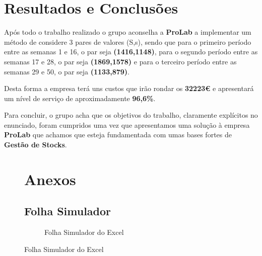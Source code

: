 \documentclass[a4paper]{article}
\begin{document}
\section{Resultados e Conclusões}
\label{sec:conclusao}

Após todo o trabalho realizado o grupo aconselha a \textbf{ProLab} a implementar um método de considere 3 pares de valores (S,s), sendo que para o primeiro período entre as semanas 1 e 16, o par seja \textbf{(1416,1148)}, para o segundo período entre as semanas 17 e 28, o par seja \textbf{(1869,1578)} e para o terceiro período entre as semanas 29 e 50, o par seja \textbf{(1133,879)}.

Desta forma a empresa terá uns custos que irão rondar os \textbf{32223\euro} e apresentará um nível de serviço de aproximadamente \textbf{96,6\%}.

Para concluir, o grupo acha que os objetivos do trabalho, claramente explícitos no enunciado, foram cumpridos uma vez que apresentamos uma solução à empresa \textbf{ProLab} que achamos que esteja fundamentada com umas bases fortes de \textbf{Gestão de Stocks}.

\newpage

\begin{figure}
\section{Anexos}

\subsection{Folha Simulador}

\begin{figure}[H]
\centering
{}
\caption{Folha Simulador do Excel}
\label{img:simulador}
\end{figure}
\end{figure}
\end{document}
